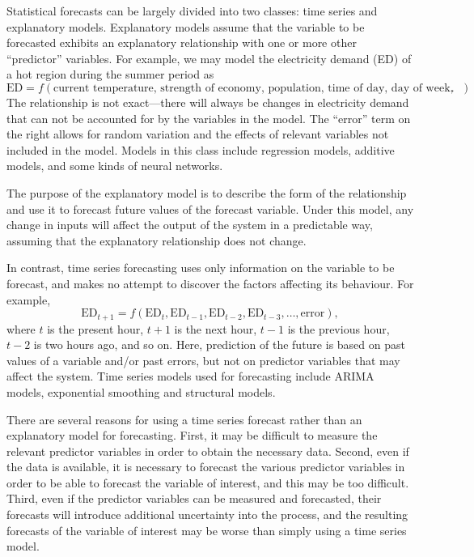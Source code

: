 \documentclass[a4paper,10pt]{article}
\begin{document}
Statistical forecasts can be largely divided into two classes: time series and explanatory models. Explanatory models assume that the variable to be forecasted exhibits an explanatory relationship with one or more other ``predictor'' variables. For example, we may model the electricity demand (ED) of a hot region during the summer period as
\begin{equation}
  \text{ED} = f(\text{current temperature, strength of economy, population, time of day, day of week, error}).
\end{equation}
The relationship is not exact---there will always be changes in electricity demand that can not be accounted for by the variables in the model. The ``error'' term on the right allows for random variation and the effects of relevant variables not included in the model. Models in this class include regression models, additive models, and some kinds of neural networks.

The purpose of the explanatory model is to describe the form of the relationship and use it to forecast future values of the forecast variable. Under this model, any change in inputs will affect the output of the system in a predictable way, assuming that the explanatory relationship does not change.

In contrast, time series forecasting uses only information on the variable to be forecast, and makes no attempt to discover the factors affecting its behaviour. For example,
\begin{equation}
  \text{ED}_{t+1} = f(\text{ED}_t,
  \text{ED}_{t-1}, \text{ED}_{t-2}, \text{ED}_{t-3},\dots, \text{error}),
\end{equation}
where $t$ is the present hour, $t + 1$ is the next hour, $t - 1$ is the previous hour, $t - 2$ is two hours ago, and so on. Here, prediction of the future is based on past values of a variable and/or past errors, but not on predictor variables that may affect the system. Time series models used for forecasting include ARIMA models, exponential smoothing and structural models.

There are several reasons for using a time series forecast rather than an explanatory model for forecasting. First, it may be difficult to measure the relevant predictor variables in order to obtain the necessary data. Second, even if the data is available, it is necessary to forecast the various predictor variables in order to be able to forecast the variable of interest, and this may be too difficult. Third, even if the predictor variables can be measured and forecasted, their forecasts will introduce additional uncertainty into the process, and the resulting forecasts of the variable of interest may be worse than simply using a time series model.
\end{document}

